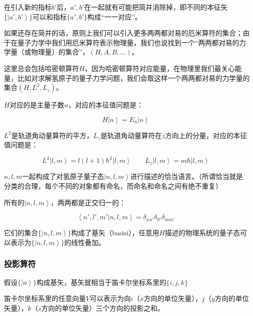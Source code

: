 在引入新的指标$b'$后，$a', b'$在一起就有可能把简并消除掉，即不同的本征矢$\{  \left| a', b' \right\rangle  \}$可以和指标$\{ a', b' \}$构成“一一对应”。

如果还存在简并的话，原则上我们可以引入更多两两都对易的厄米算符的集合；由于在量子力学中我们用厄米算符表示物理量，我们也说找到一个“两两都对易的力学量（或物理量）的集合”，$\left( H, A, B, ...  \right)$。

这里总会包括哈密顿算符$H$，因为哈密顿算符对应能量，在物理里我们最关心能量，比如对求解氢原子的量子力学问题，我们会取这样一个两两都对易的力学量的集合$\left( H, L^2, L_z  \right)$。

$H$对应的是主量子数$n$，对应的本征值问题是：

\begin{equation}
H \left| n \right\rangle = E_n \left| n \right\rangle~
\end{equation}

$L^2$是轨道角动量算符的平方，$L_z$是轨道角动量算符在$z$方向上的分量，对应的本征值问题是：

\begin{equation}
L^2 \left| l, m \right\rangle  =  l (l + 1 )\hbar^2 \left| l, m \right\rangle \qquad
L_z \left| l, m \right\rangle  =  m \hbar \left| l, m \right\rangle~
\end{equation}

$n, l, m$一起构成了对氢原子量子态$\left| n, l, m \right\rangle$进行描述的恰当语言。（所谓恰当就是分类的合理，每个不同的对象都有命名，而命名和命名之间有绝不重复）

所有的$\left| n, l, m \right\rangle$，两两都是正交归一的：

\begin{equation}
\left\langle n', l', m' | n, l, m \right\rangle = \delta_{nn'} \delta_{ll'} \delta_{mm'}~
\end{equation}

它们的集合$\{ \left| n, l, m \right\rangle \}$构成了基矢（basisi），任意用$H$描述的物理系统的量子态可以表示为$\{ \left| n, l, m \right\rangle \}$的线性叠加。

\subsubsection{投影算符}

假设$\{  \left| n \right\rangle \}$构成基矢，基矢就相当于笛卡尔坐标系里的$\{ i, j, k \}$

笛卡尔坐标系里的任意向量$V$可以表示为向$i$（$x$方向的单位矢量），$j$（$y$方向的单位矢量），$k$（$z$方向的单位矢量）三个方向的投影之和。

